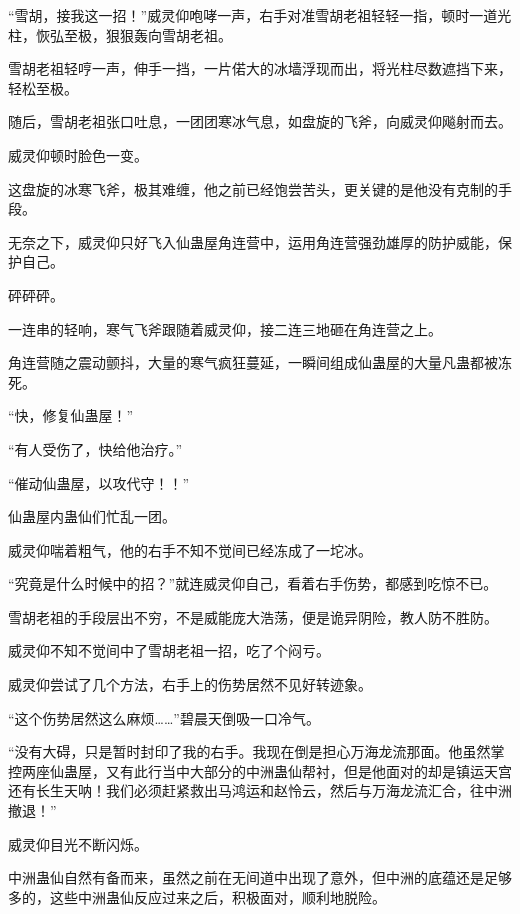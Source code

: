 
\begin{this_body}



“雪胡，接我这一招！”威灵仰咆哮一声，右手对准雪胡老祖轻轻一指，顿时一道光柱，恢弘至极，狠狠轰向雪胡老祖。

雪胡老祖轻哼一声，伸手一挡，一片偌大的冰墙浮现而出，将光柱尽数遮挡下来，轻松至极。

随后，雪胡老祖张口吐息，一团团寒冰气息，如盘旋的飞斧，向威灵仰飚射而去。

威灵仰顿时脸色一变。

这盘旋的冰寒飞斧，极其难缠，他之前已经饱尝苦头，更关键的是他没有克制的手段。

无奈之下，威灵仰只好飞入仙蛊屋角连营中，运用角连营强劲雄厚的防护威能，保护自己。

砰砰砰。

一连串的轻响，寒气飞斧跟随着威灵仰，接二连三地砸在角连营之上。

角连营随之震动颤抖，大量的寒气疯狂蔓延，一瞬间组成仙蛊屋的大量凡蛊都被冻死。

“快，修复仙蛊屋！”

“有人受伤了，快给他治疗。”

“催动仙蛊屋，以攻代守！！”

仙蛊屋内蛊仙们忙乱一团。

威灵仰喘着粗气，他的右手不知不觉间已经冻成了一坨冰。

“究竟是什么时候中的招？”就连威灵仰自己，看着右手伤势，都感到吃惊不已。

雪胡老祖的手段层出不穷，不是威能庞大浩荡，便是诡异阴险，教人防不胜防。

威灵仰不知不觉间中了雪胡老祖一招，吃了个闷亏。

威灵仰尝试了几个方法，右手上的伤势居然不见好转迹象。

“这个伤势居然这么麻烦……”碧晨天倒吸一口冷气。

“没有大碍，只是暂时封印了我的右手。我现在倒是担心万海龙流那面。他虽然掌控两座仙蛊屋，又有此行当中大部分的中洲蛊仙帮衬，但是他面对的却是镇运天宫还有长生天呐！我们必须赶紧救出马鸿运和赵怜云，然后与万海龙流汇合，往中洲撤退！”

威灵仰目光不断闪烁。

中洲蛊仙自然有备而来，虽然之前在无间道中出现了意外，但中洲的底蕴还是足够多的，这些中洲蛊仙反应过来之后，积极面对，顺利地脱险。


\end{this_body}
